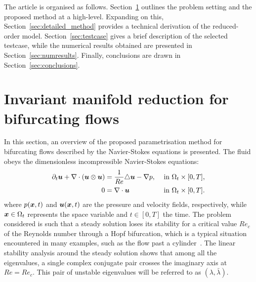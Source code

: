 \documentclass[%
reprint,
superscriptaddress,
 amsmath,amssymb,
 aps,
 pre
]{revtex4-2}
\begin{document}
The article is organised as follows. Section~\ref{sec:DPIM_NSv2} outlines the problem setting and the proposed method at a high-level. Expanding on this, Section~\ref{sec:detailed_method} provides a technical derivation of the reduced-order model. Section~\ref{sec:testcase} gives a brief description of the selected testcase, while the numerical results obtained are presented in Section~\ref{sec:numresults}. Finally, conclusions are drawn in Section~\ref{sec:conclusions}.



\section{Invariant manifold reduction for bifurcating flows}
\label{sec:DPIM_NSv2}

In this section, an overview of the proposed parametrisation method for bifurcating flows described by the Navier-Stokes equations is presented. The fluid obeys the dimensionless incompressible Navier-Stokes equations:
\begin{equation}
\label{eq:NS}
\begin{aligned}
\partial_t {\boldsymbol{u}} + \nabla \cdot ({\boldsymbol{u}} \otimes {\boldsymbol{u}}) & = \frac{1}{Re}\triangle {\boldsymbol{u}} - \nabla p,&\text { in } \Omega_t \times[0, T],\\
    0 &= \nabla \cdot {\boldsymbol{u}}  &\text { in } \Omega_t \times[0, T].
\end{aligned}
\end{equation}
%
where $p({\boldsymbol{x}}, t)$ and ${\boldsymbol{u}} ({\boldsymbol{x}}, t)$ are the pressure and velocity fields, respectively, while ${\boldsymbol{x}} \in \Omega_t$ represents the space variable and $t\in [0,T]$ the time. The problem considered is such that a steady solution loses its stability for a critical value $Re_c$ of the Reynolds number through a Hopf bifurcation, which is a typical situation encountered in many examples, such as the flow past a cylinder~\cite{zdravkovich1997}. The linear stability analysis around the steady solution shows that among all the eigenvalues, a single complex conjugate pair crosses the imaginary axis at $Re = Re_c$. This pair of unstable eigenvalues will be referred to as $(\lambda, \bar{\lambda})$.
\end{document}
